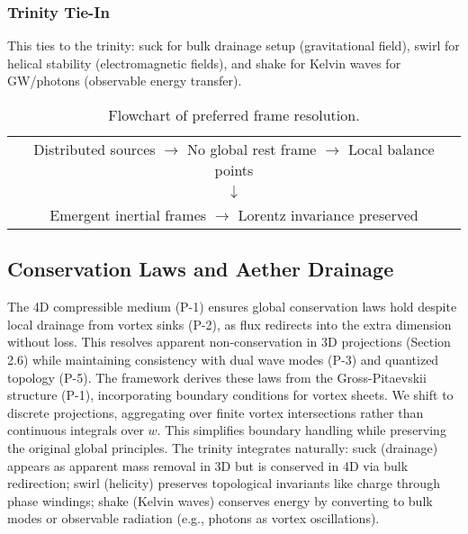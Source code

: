 \subsubsection{Trinity Tie-In}

This ties to the trinity: suck for bulk drainage setup (gravitational field), swirl for helical stability (electromagnetic fields), and shake for Kelvin waves for GW/photons (observable energy transfer).

\begin{table}[h]
\centering
\begin{tabular}{c}
Distributed sources $\to$ No global rest frame $\to$ Local balance points \\
$\downarrow$ \\
Emergent inertial frames $\to$ Lorentz invariance preserved
\end{tabular}
\caption{Flowchart of preferred frame resolution.}
\label{tab:frame-flow}
\end{table}

\medskip

\subsection{Conservation Laws and Aether Drainage}

The 4D compressible medium (P-1) ensures global conservation laws hold despite local drainage from vortex sinks (P-2), as flux redirects into the extra dimension without loss. This resolves apparent non-conservation in 3D projections (Section 2.6) while maintaining consistency with dual wave modes (P-3) and quantized topology (P-5). The framework derives these laws from the Gross-Pitaevskii structure (P-1), incorporating boundary conditions for vortex sheets. We shift to discrete projections, aggregating over finite vortex intersections rather than continuous integrals over $w$. This simplifies boundary handling while preserving the original global principles. The trinity integrates naturally: suck (drainage) appears as apparent mass removal in 3D but is conserved in 4D via bulk redirection; swirl (helicity) preserves topological invariants like charge through phase windings; shake (Kelvin waves) conserves energy by converting to bulk modes or observable radiation (e.g., photons as vortex oscillations).

